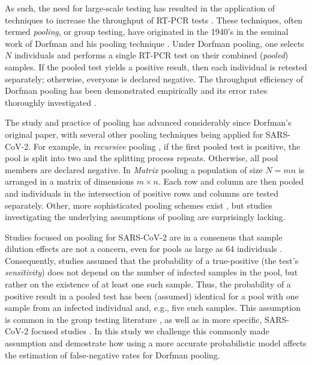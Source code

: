 \documentclass{article}
\begin{document}
As such, the need for large-scale testing has
resulted in the application of techniques to increase the throughput
of RT-PCR tests \cite{DorfmanYuvalDor, PoolSize30, BayesianDorfman,
  MatrixPooling, LionDorfman, CherifReview}. These techniques, often
termed \emph{pooling}, or group testing, have originated in the 1940's
in the seminal work of Dorfman and his pooling technique
\cite{DorfmanOriginal, DorfmanYuvalDor}. Under Dorfman pooling, one
selects $N$ individuals and performs a single RT-PCR test on their
combined (\emph{pooled}) samples. If the pooled test yields a positive
result, then each individual is retested separately; otherwise,
everyone is declared negative. The throughput efficiency of Dorfman
pooling has been demonstrated empirically \cite{DorfmanYuvalDor} and
its error rates thoroughly investigated \cite{Kim, Simplistic1,
  OptimalDorfmanPool}. 
  
The study and practice of pooling has advanced considerably since Dorfman's original paper, with several other pooling techniques being applied for SARS-CoV-2.
For example, in \emph{recursive} pooling \cite{Kim,RecursiveSevenFold}, if the
first pooled test is positive, the pool is split into two and the splitting
process repeats. Otherwise, all pool members are declared negative.
In \emph{Matrix} pooling \cite{MatrixPooling} a population of size
$N=mn$ is arranged in a matrix of dimensions $m\times n$. Each
row and column are then pooled and individuals in the intersection of
positive rows and columns are tested separately. Other, more sophisticated
pooling schemes exist \cite{CompressedPooling}, but studies investigating the 
underlying assumptions of pooling are surprisingly lacking.

Studies focused on pooling for SARS-CoV-2 are in a consensus that
sample dilution effects \cite{DilutionHIV, GroupDilution} are not a
concern, even for pools as large as 64 individuals \cite{PoolSize30,
  Lion, DorfmanYuvalDor, DilutionCOVID, CherifReview}. Consequently,
studies assumed that the probability of a true-positive (the test's
\emph{sensitivity}) does not depend on the number of infected samples
in the pool, but rather on the existence of at least one such
sample. Thus, the probability of a positive result in a pooled test
has been (assumed) identical for a pool with one sample from an
infected individual and, e.g., five such samples. This assumption is
common in the group testing literature \cite{Kim, OptimalDorfmanPool,
  CherifReview}, as well as in more specific, SARS-CoV-2 focused studies
\cite{Simplistic1, Simplistic2}. In this study we challenge this
commonly made assumption and demostrate how using a more accurate
probabilistic model affects the estimation of false-negative rates for
Dorfman pooling.
\end{document}

